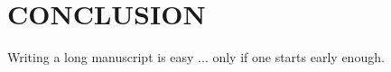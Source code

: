 \chapter{CONCLUSION} %
\label{chap:conclude}

Writing a long manuscript is easy ... only if one starts early enough. 
